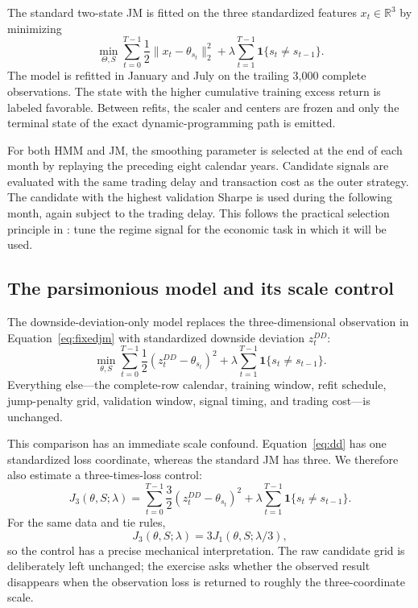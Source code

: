 \documentclass[11pt]{article}
\newcommand{\ind}{\mathbf{1}}
\begin{document}
The standard two-state JM is fitted on the three standardized features $x_t\in\mathbb{R}^3$ by minimizing
\begin{equation}
\min_{\Theta,S}\sum_{t=0}^{T-1}\frac{1}{2}\lVert x_t-\theta_{s_t}\rVert_2^2
+\lambda\sum_{t=1}^{T-1}\ind\{s_t\neq s_{t-1}\}.
\label{eq:fixedjm}
\end{equation}
The model is refitted in January and July on the trailing 3,000 complete observations. The state with the higher cumulative training excess return is labeled favorable. Between refits, the scaler and centers are frozen and only the terminal state of the exact dynamic-programming path is emitted.

For both HMM and JM, the smoothing parameter is selected at the end of each month by replaying the preceding eight calendar years. Candidate signals are evaluated with the same trading delay and transaction cost as the outer strategy. The candidate with the highest validation Sharpe is used during the following month, again subject to the trading delay. This follows the practical selection principle in \citet{shu2024}: tune the regime signal for the economic task in which it will be used.

\subsection{The parsimonious model and its scale control}

The downside-deviation-only model replaces the three-dimensional observation in Equation~\eqref{eq:fixedjm} with standardized downside deviation $z_t^{DD}$:
\begin{equation}
\min_{\theta,S}\sum_{t=0}^{T-1}\frac{1}{2}(z_t^{DD}-\theta_{s_t})^2
+\lambda\sum_{t=1}^{T-1}\ind\{s_t\neq s_{t-1}\}.
\label{eq:dd}
\end{equation}
Everything else---the complete-row calendar, training window, refit schedule, jump-penalty grid, validation window, signal timing, and trading cost---is unchanged.

This comparison has an immediate scale confound. Equation~\eqref{eq:dd} has one standardized loss coordinate, whereas the standard JM has three. We therefore also estimate a three-times-loss control:
\begin{equation}
J_3(\theta,S;\lambda)=\sum_{t=0}^{T-1}\frac{3}{2}(z_t^{DD}-\theta_{s_t})^2
+\lambda\sum_{t=1}^{T-1}\ind\{s_t\neq s_{t-1}\}.
\label{eq:scaled}
\end{equation}
For the same data and tie rules,
\begin{equation}
J_3(\theta,S;\lambda)=3J_1(\theta,S;\lambda/3),
\end{equation}
so the control has a precise mechanical interpretation. The raw candidate grid is deliberately left unchanged; the exercise asks whether the observed result disappears when the observation loss is returned to roughly the three-coordinate scale.
\end{document}
